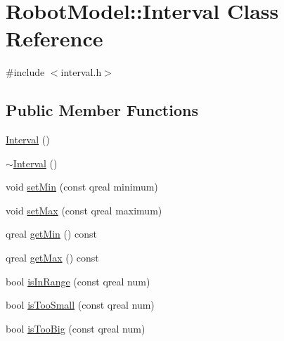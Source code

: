 \hypertarget{class_robot_model_1_1_interval}{
\section{RobotModel::Interval Class Reference}
\label{class_robot_model_1_1_interval}
}


{\ttfamily \#include $<$interval.h$>$}\subsection*{Public Member Functions}
\begin{DoxyCompactItemize}
\item 
\hyperlink{class_robot_model_1_1_interval_ae48b9a9e9f672f81977627b609e32429}{Interval} ()
\item 
\hyperlink{class_robot_model_1_1_interval_a923e1717a3dedfe1ba90f81fcb26d5c5}{$\sim$Interval} ()
\item 
void \hyperlink{class_robot_model_1_1_interval_a093471bdcba90e074543fb2781287145}{setMin} (const qreal minimum)
\item 
void \hyperlink{class_robot_model_1_1_interval_a7deeccee610088a7aebef94919fd6f36}{setMax} (const qreal maximum)
\item 
qreal \hyperlink{class_robot_model_1_1_interval_abb8aac06ae73b9dfc7c3caf3f8b56399}{getMin} () const 
\item 
qreal \hyperlink{class_robot_model_1_1_interval_a26857944f58e736ed0abdf534e2f56d8}{getMax} () const 
\item 
bool \hyperlink{class_robot_model_1_1_interval_a26125787902f3761e303ba3999d0eb71}{isInRange} (const qreal num)
\item 
bool \hyperlink{class_robot_model_1_1_interval_a15ffb7f16e3bad02073761ecd23d9695}{isTooSmall} (const qreal num)
\item 
bool \hyperlink{class_robot_model_1_1_interval_ae8da5063cbb210bdc856e30ea2b01f19}{isTooBig} (const qreal num)
\end{DoxyCompactItemize}


